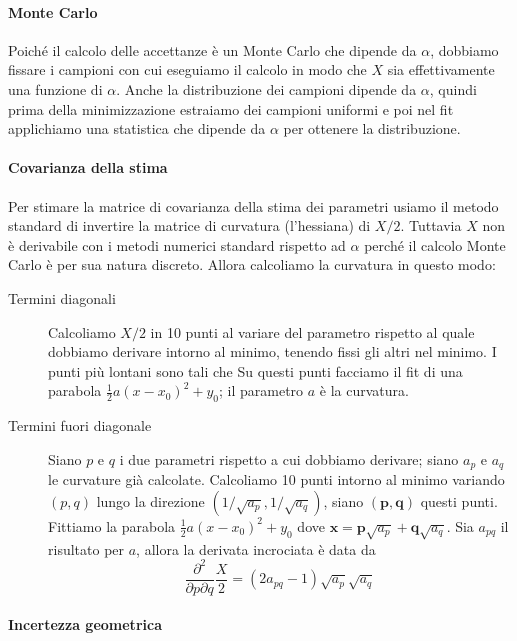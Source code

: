 \paragraph{Monte Carlo}

Poiché il calcolo delle accettanze è un Monte Carlo che dipende da $\alpha$,
dobbiamo fissare i campioni con cui eseguiamo il calcolo
in modo che $X$ sia effettivamente una funzione di $\alpha$.
Anche la distribuzione dei campioni dipende da $\alpha$,
quindi prima della minimizzazione estraiamo dei campioni uniformi
e poi nel fit applichiamo una statistica che dipende da $\alpha$ per ottenere la distribuzione.

\paragraph{Covarianza della stima}

Per stimare la matrice di covarianza della stima dei parametri
usiamo il metodo standard di invertire la matrice di curvatura (l'hessiana) di $X/2$.
Tuttavia $X$ non è derivabile con i metodi numerici standard rispetto ad $\alpha$ perché
il calcolo Monte Carlo è per sua natura discreto.
Allora calcoliamo la curvatura in questo modo:
\begin{description}
	\item[Termini diagonali]
		Calcoliamo $X/2$ in 10 punti al variare del parametro rispetto al quale dobbiamo derivare intorno al minimo,
		tenendo fissi gli altri nel minimo. I punti più lontani sono tali che 
		Su questi punti facciamo il fit di una parabola $\frac12a(x-x_0)^2+y_0$;
		il parametro $a$ è la curvatura.
	\item[Termini fuori diagonale]
		Siano $p$ e $q$ i due parametri rispetto a cui dobbiamo derivare;
		siano $a_p$ e $a_q$ le curvature già calcolate.
		Calcoliamo 10 punti intorno al minimo variando $(p,q)$ lungo la direzione $(1/\sqrt{a_p},1/\sqrt{a_q})$,
		siano $(\mathbf p,\mathbf q)$ questi punti.
		Fittiamo la parabola $\frac12a(x-x_0)^2+y_0$ dove $\mathbf x=\mathbf p\sqrt{a_p} + \mathbf q\sqrt{a_q}$.
		Sia $a_{pq}$ il risultato per $a$, allora la derivata incrociata è data da
		\begin{equation*}
			\frac{\partial^2}{\partial p\partial q} \frac X2 = (2a_{pq} - 1)\sqrt{a_p}\sqrt{a_q}
		\end{equation*}
\end{description}

\paragraph{Incertezza geometrica}

